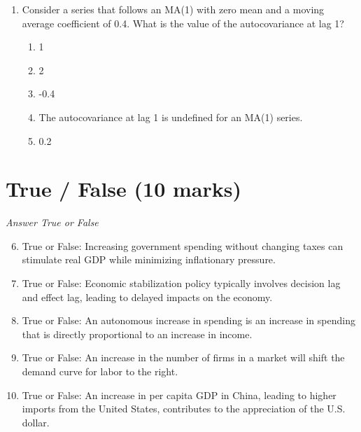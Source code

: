 \documentclass[12pt]{article}
\begin{document}
\begin{enumerate}[label=\arabic*.]
\begin{enumerate}[label=(\alph*)]
    \item Real GDP will decrease.
    \item The unemployment rate will increase.
    \item The country's trade balance will worsen.
    \item The interest rate will decrease.
    \item The price level will increase.
\end{enumerate}
\item Consider a series that follows an MA(1) with zero mean and a moving average coefficient of 0.4. What is the value of the autocovariance at lag 1?
\begin{enumerate}[label=(\alph*)]
    \item 1
    \item 2
    \item -0.4
    \item The autocovariance at lag 1 is undefined for an MA(1) series.
    \item 0.2
\end{enumerate}
\end{enumerate}

\section*{True / False (10 marks)}
\textit{Answer True or False}
\begin{enumerate}[label=\arabic*.]
\setcounter{enumi}{5}
\item True or False: Increasing government spending without changing taxes can stimulate real GDP while minimizing inflationary pressure.
\item True or False: Economic stabilization policy typically involves decision lag and effect lag, leading to delayed impacts on the economy.
\item True or False: An autonomous increase in spending is an increase in spending that is directly proportional to an increase in income.
\item True or False: An increase in the number of firms in a market will shift the demand curve for labor to the right.
\item True or False: An increase in per capita GDP in China, leading to higher imports from the United States, contributes to the appreciation of the U.S. dollar.
\end{enumerate}
\end{document}
